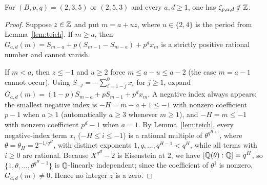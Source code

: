 \documentclass[11pt]{article}
\begin{document}
\begin{proposition}\label{th:eisen}
For $(B,p,q)=(2,3,5)$ or $(2,5,3)$ and every $a,d\ge1$, one has $\zeta_{p,a,d}\notin\mathbb Z$.
\end{proposition}
\begin{proof}
Suppose $z\in\mathbb Z$ and put $m=a+uz$, where $u\in\{2,4\}$ is the period from Lemma~\ref{lem:teich}. If $m\ge a$, then $G_{a,d}(m)=S_{m-a}+p(S_{m-1}-S_{m-a})+p^d x_m$ is a strictly positive rational number and cannot vanish.

If $m<a$, then $z\le-1$ and $u\ge2$ force $m\le a-u\le a-2$ (the case $m=a-1$ cannot occur). Using $S_{-j}=-\sum_{i=1-j}^0 x_i$ for $j\ge1$, expand $G_{a,d}(m)=(1-p)S_{m-a}+pS_{m-1}+p^d x_m$. A negative index always appears: the smallest negative index is $-H=m-a+1\le-1$ with nonzero coefficient $p-1$ when $a>1$ (automatically $a\ge3$ whenever $m\ge1$), and $-H=m\le-1$ with nonzero coefficient $p^d-1$ when $a=1$. By Lemma~\ref{lem:teich}, every negative-index term $x_i$ ($-H\le i\le-1$) is a rational multiple of $\theta^{q^{H+i}}$, where $\theta=\theta_H=2^{-1/q^H}$, with distinct exponents $1,q,\ldots,q^{H-1}<q^H$, while all terms with $i\ge0$ are rational. Because $X^{q^H}-2$ is Eisenstein at $2$, we have $[\mathbb Q(\theta):\mathbb Q]=q^H$, so $\{1,\theta,\ldots,\theta^{q^H-1}\}$ is $\mathbb Q$-linearly independent; since the coefficient of $\theta^1$ is nonzero, $G_{a,d}(m)\ne0$. Hence no integer $z$ is a zero.
\end{proof}
\end{document}
